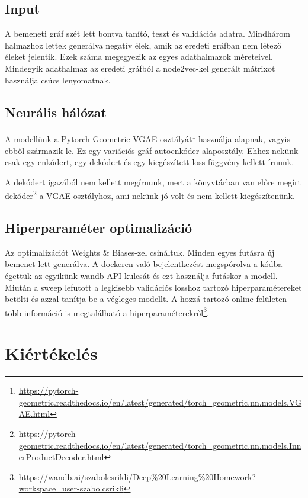 \documentclass{article}
\begin{document}
		\subsection{Input}
		
			\par A bemeneti gráf szét lett bontva tanító, teszt és validációs adatra. Mindhárom halmazhoz lettek generálva negatív élek, amik az eredeti gráfban nem létező éleket jelentik. Ezek száma megegyezik az egyes adathalmazok méreteivel. Mindegyik adathalmaz az eredeti gráfból a node2vec-kel generált mátrixot használja csúcs lenyomatnak.
			
		\subsection{Neurális hálózat}
		
			\par A modellünk a Pytorch Geometric VGAE osztályát\footnote{\url{https://pytorch-geometric.readthedocs.io/en/latest/generated/torch_geometric.nn.models.VGAE.html}} használja alapnak, vagyis ebből származik le. Ez egy variációs gráf autoenkóder alaposztály. Ehhez nekünk csak egy enkódert, egy dekódert és egy kiegészített loss függvény kellett írnunk.
			
			\par A dekódert igazából nem kellett megírnunk, mert a könyvtárban van előre megírt dekóder\footnote{\url{https://pytorch-geometric.readthedocs.io/en/latest/generated/torch_geometric.nn.models.InnerProductDecoder.html}} a VGAE osztályhoz, ami nekünk jó volt és nem kellett kiegészítenünk.
			
		\subsection{Hiperparaméter optimalizáció}
		
			\par Az optimalizációt Weights \& Biases-zel csináltuk. Minden egyes futásra új bemenet lett generálva. A dockeren való bejelentkezést megspórolva a kódba égettük az egyikünk wandb API kulcsát és ezt használja futáskor a modell. Miután a sweep lefutott a legkisebb validációs losshoz tartozó hiperparamétereket betölti és azzal tanítja be a végleges modellt. A hozzá tartozó online felületen több információ is megtalálható a hiperparaméterekről\footnote{\url{https://wandb.ai/szabolcsrikli/Deep\%20Learning\%20Homework?workspace=user-szabolcsrikli}}.
	
	\section{Kiértékelés}
	
\end{document}
